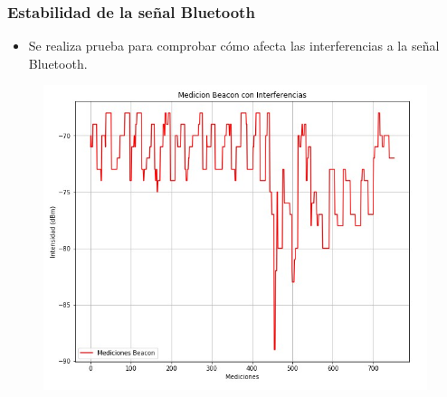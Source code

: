 \documentclass[mathserif]{beamer}
\begin{document}

\begin{frame}
\frametitle{Estabilidad de la señal Bluetooth}

\begin{itemize}
\item Se realiza prueba para comprobar cómo afecta las interferencias a la señal Bluetooth.

\end{itemize}

\begin{figure}
\includegraphics[width=.7\textheight]{../figures/mediciones_beacon_interferencia.jpg}
\end{figure}

\end{frame}

\end{document}
